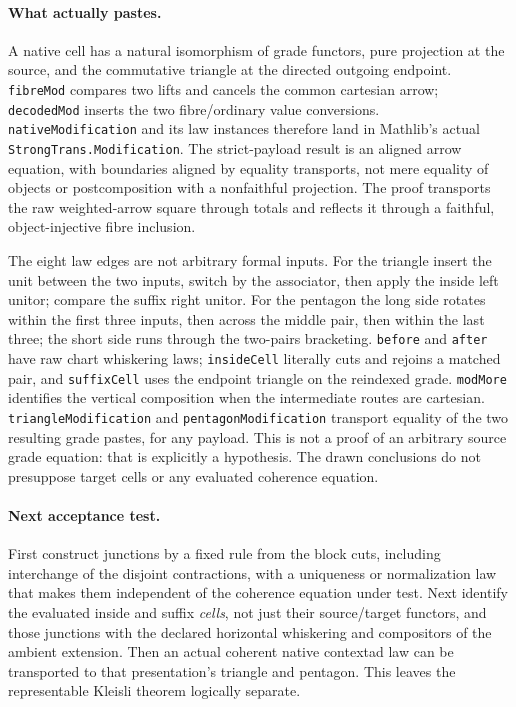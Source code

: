 \documentclass[11pt]{article}
\begin{document}
\paragraph{What actually pastes.}
A native cell has a natural isomorphism of grade functors, pure projection at
the source, and the commutative triangle at the directed outgoing endpoint.
\texttt{fibreMod} compares two lifts and cancels the common cartesian arrow;
\texttt{decodedMod} inserts the two fibre/ordinary value conversions.
\texttt{nativeModification} and its law instances therefore land in
Mathlib's actual \texttt{StrongTrans.Modification}. The strict-payload result
is an aligned arrow equation, with boundaries aligned by equality transports,
not mere equality of objects or postcomposition with a nonfaithful projection.
The proof transports the raw weighted-arrow square through totals and reflects
it through a faithful, object-injective fibre inclusion.
\par The eight law edges are not arbitrary formal inputs. For the triangle
insert the unit between the two inputs, switch by the associator, then apply
the inside left unitor; compare the suffix right unitor. For the pentagon
the long side rotates within the first three inputs, then across the middle
pair, then within the last three; the short side runs through the two-pairs
bracketing. \texttt{before} and \texttt{after} have raw chart whiskering laws;
\texttt{insideCell} literally cuts and rejoins a matched pair, and
\texttt{suffixCell} uses the endpoint triangle on the reindexed grade.
\texttt{modMore} identifies the vertical composition when the intermediate
routes are cartesian. \texttt{triangleModification} and
\texttt{pentagonModification} transport equality of the two resulting grade
pastes, for any payload. This is not a proof of an arbitrary source grade
equation: that is explicitly a hypothesis. The drawn conclusions do not
presuppose target cells or any evaluated coherence equation.
\paragraph{Next acceptance test.}
First construct junctions by a fixed rule from the block cuts, including
interchange of the disjoint contractions, with a uniqueness or normalization
law that makes them independent of the coherence equation under test. Next
identify the evaluated inside and suffix \emph{cells}, not just their
source/target functors, and those junctions with the declared horizontal
whiskering and compositors of the ambient extension. Then an actual coherent
native contextad law can be transported to that presentation's triangle and
pentagon. This leaves the representable Kleisli theorem logically separate.
\end{document}
